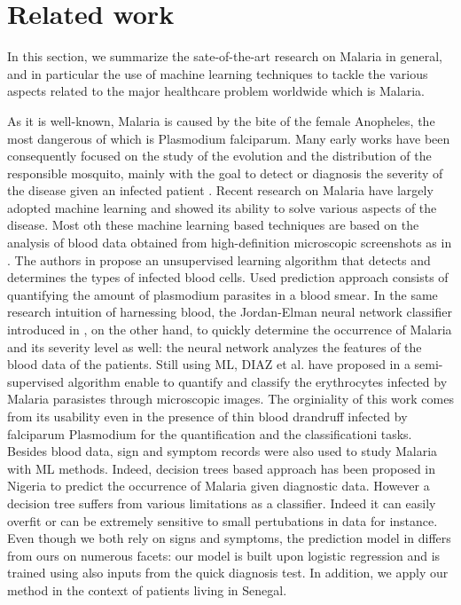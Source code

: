 \section{Related work}\label{related_work}
In this section, we summarize the sate-of-the-art research on Malaria in general, and in particular the
use of machine learning techniques to tackle the various aspects related to the 
major healthcare problem worldwide which is Malaria.

As it is well-known, Malaria is caused by the bite of the female Anopheles, the most dangerous of which
is Plasmodium falciparum. Many early works have been consequently focused on the study of the evolution and
the distribution of the responsible mosquito, mainly with the goal to detect or diagnosis the severity of the 
disease given an infected patient \cite{Fe03,Al09}. Recent research on Malaria have largely adopted machine learning
and showed its ability to solve various aspects of the disease. Most oth these machine learning based techniques are 
based on the analysis of blood data obtained from high-definition microscopic screenshots as in \cite{Ku18}. The authors
in \cite{Ku18} propose an unsupervised learning algorithm that detects and determines the types of infected blood cells.
Used prediction approach consists of quantifying the amount of plasmodium parasites in a blood smear. In the same research intuition
of harnessing blood, the Jordan-Elman neural network classifier introduced in \cite{Ha15}, on the other hand, to quickly determine the occurrence 
of Malaria and its severity level as well: the neural network analyzes the features of the blood data of the patients.  
Still using ML, DIAZ et al. have proposed in \cite{Dia09} a semi-supervised algorithm enable to quantify and classify the 
erythrocytes infected by Malaria parasistes through microscopic images. The orginiality of this work comes from its usability
even in the presence of thin blood drandruff infected by falciparum Plasmodium for the quantification and the classificationi tasks.
Besides blood data, sign and symptom records were also used to study Malaria with ML methods. Indeed, decision trees based approach
has been proposed in Nigeria \cite{Ug10} to predict the occurrence of Malaria given diagnostic data. However a decision tree suffers 
from various limitations as a classifier. Indeed it can easily overfit or can be extremely sensitive to small pertubations in data for instance.
Even though we both rely on signs and symptoms, the prediction model in \cite{Ug10} differs from ours on numerous facets: our model is built upon
logistic regression and is trained using also inputs from the quick diagnosis test. In addition, we apply our method in the context of patients living in Senegal. 

